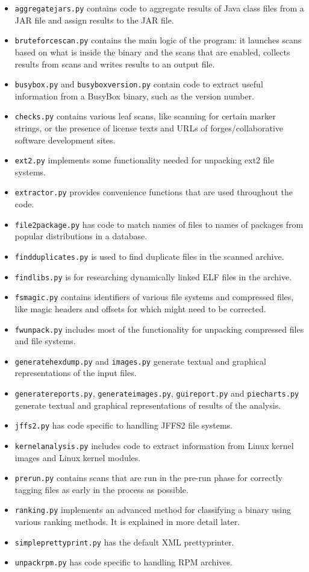 \documentclass[10pt]{article}
\begin{document}
\begin{itemize}
\item \texttt{aggregatejars.py} contains code to aggregate results of Java
class files from a JAR file and assign results to the JAR file.
\item \texttt{bruteforcescan.py} contains the main logic of the program: it
launches scans based on what is inside the binary and the scans that are
enabled, collects results from scans and writes results to an output file.
\item \texttt{busybox.py} and \texttt{busyboxversion.py} contain code to
extract useful information from a BusyBox binary, such as the version number.
\item \texttt{checks.py} contains various leaf scans, like scanning for certain
marker strings, or the presence of license texts and URLs of
forges/collaborative software development sites.
\item \texttt{ext2.py} implements some functionality needed for unpacking ext2
file systems.
\item \texttt{extractor.py} provides convenience functions that are used
throughout the code.
\item \texttt{file2package.py} has code to match names of files to names of
packages from popular distributions in a database.
\item \texttt{findduplicates.py} is used to find duplicate files in the scanned
archive.
\item \texttt{findlibs.py} is for researching dynamically linked ELF files in
the archive.
\item \texttt{fsmagic.py} contains identifiers of various file systems and
compressed files, like magic headers and offsets for which might need to be
corrected.
\item \texttt{fwunpack.py} includes most of the functionality for unpacking
compressed files and file systems.
\item \texttt{generatehexdump.py} and \texttt{images.py} generate textual and
graphical representations of the input files.
\item \texttt{generatereports.py}, \texttt{generateimages.py},
\texttt{guireport.py} and \texttt{piecharts.py} generate textual and graphical
representations of results of the analysis.
\item \texttt{jffs2.py} has code specific to handling JFFS2 file systems.
\item \texttt{kernelanalysis.py} includes code to extract information from
Linux kernel images and Linux kernel modules.
\item \texttt{prerun.py} contains scans that are run in the pre-run phase for
correctly tagging files as early in the process as possible.
\item \texttt{ranking.py} implements an advanced method for classifying a
binary using various ranking methods. It is explained in more detail later.
\item \texttt{simpleprettyprint.py} has the default XML prettyprinter.
\item \texttt{unpackrpm.py} has code specific to handling RPM archives.
\end{itemize}
\end{document}
